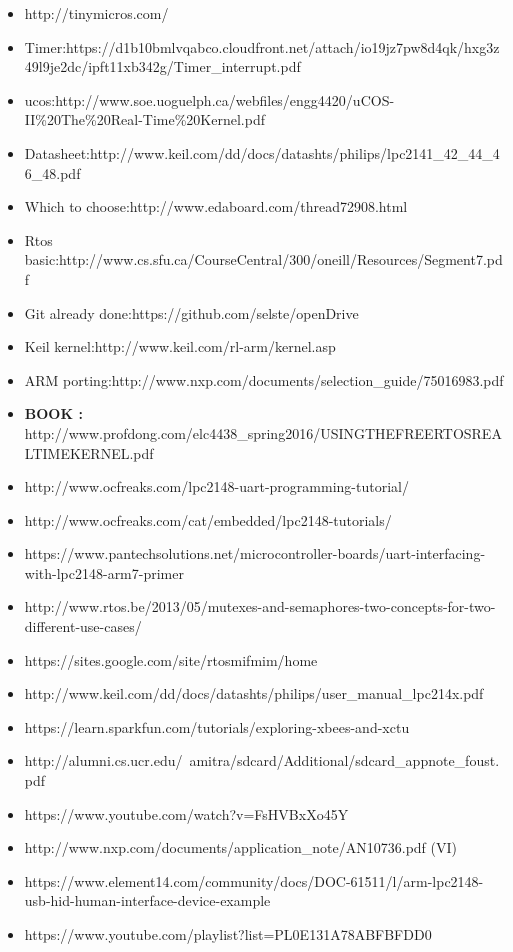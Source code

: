 \documentclass[11pt,a4paper]{book}
\begin{document}
	\begin{itemize}
		\item http://tinymicros.com/
		\item Timer:https://d1b10bmlvqabco.cloudfront.net/attach/io19jz7pw8d4qk/hxg3z49l9je2dc/ipft11xb342g/Timer\_interrupt.pdf
		
		\item ucos:http://www.soe.uoguelph.ca/webfiles/engg4420/uCOS-II\%20The\%20Real-Time\%20Kernel.pdf
		
		\item Datasheet:http://www.keil.com/dd/docs/datashts/philips/lpc2141\_42\_44\_46\_48.pdf
		\item Which to choose:http://www.edaboard.com/thread72908.html
		\item Rtos basic:http://www.cs.sfu.ca/CourseCentral/300/oneill/Resources/Segment7.pdf
		\item Git already done:https://github.com/selste/openDrive
		\item Keil kernel:http://www.keil.com/rl-arm/kernel.asp
		\item ARM porting:http://www.nxp.com/documents/selection\_guide/75016983.pdf
		\item \textbf{BOOK :}
		http://www.profdong.com/elc4438\_spring2016/USINGTHEFREERTOSREALTIMEKERNEL.pdf
		\item http://www.ocfreaks.com/lpc2148-uart-programming-tutorial/
		\item http://www.ocfreaks.com/cat/embedded/lpc2148-tutorials/
		\item https://www.pantechsolutions.net/microcontroller-boards/uart-interfacing-with-lpc2148-arm7-primer
		\item http://www.rtos.be/2013/05/mutexes-and-semaphores-two-concepts-for-two-different-use-cases/
		\item https://sites.google.com/site/rtosmifmim/home
		\item http://www.keil.com/dd/docs/datashts/philips/user\_manual\_lpc214x.pdf
		\item https://learn.sparkfun.com/tutorials/exploring-xbees-and-xctu
		\item http://alumni.cs.ucr.edu/~amitra/sdcard/Additional/sdcard\_appnote\_foust.pdf
		\item https://www.youtube.com/watch?v=FsHVBxXo45Y
		\item http://www.nxp.com/documents/application\_note/AN10736.pdf (VI)
		\item https://www.element14.com/community/docs/DOC-61511/l/arm-lpc2148-usb-hid-human-interface-device-example
		\item https://www.youtube.com/playlist?list=PL0E131A78ABFBFDD0
		

\end{itemize}
\end{document}
